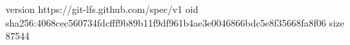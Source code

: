 version https://git-lfs.github.com/spec/v1
oid sha256:4068cec560734fdcfff9b89b11f9df961b4ae3e0046866bdc5e8f35668fa8f06
size 87544
